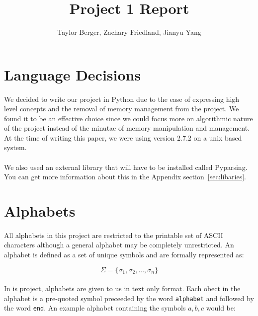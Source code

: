 \documentclass{article}
\begin{document}
\title{Project 1 Report}
\author{Taylor Berger, Zachary Friedland, Jianyu Yang}
\maketitle

\section{Language Decisions}
\paragraph{} We decided to write our project in Python due to the ease of
expressing high level concepts and the removal of memory management
from the project. We found it to be an effective choice since we could
focus more on algorithmic nature of the project instead of the minutae
of memory manipulation and management. At the time of writing this
paper, we were using version 2.7.2 on a unix based system.

\paragraph{} We also used an external library that will have to be installed
called Pyparsing. You can get more information about this in the Appendix 
section~\ref{sec:libaries}.

\section{Alphabets}
\label{sec:alphabet}
\paragraph{} All alphabets in this project are restricted to the printable set of
ASCII characters although a general alphabet may be completely
unrestricted. An alphabet is defined as a set of unique symbols and are formally represented as:

\[\Sigma = \{\sigma_1, \sigma_2, ... ,\sigma_n\}\]

\paragraph{} In is project, alphabets are given to us in text only format.
 Each obect in the alphabet is a pre-quoted symbol preceeded by the
 word \verb|alphabet| and followed by the word \verb|end|. An example
 alphabet containing the symbols $a,b,c$ would be:
\end{document}
